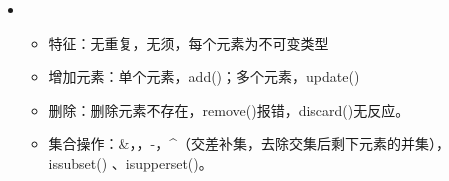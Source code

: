 \documentclass[letterpaper,10pt,english]{sphinxmanual}
\begin{document}
\begin{itemize}
\begin{itemize}
\end{itemize}

%
\begin{sphinxVerbatim}[commandchars=\\\{\},numbers=left,firstnumber=1,stepnumber=1]
   
   
\PYG{p}{[}\PYG{p}{]}
\PYG{p}{[}\PYG{p}{]}
\end{sphinxVerbatim}

\begin{sphinxadmonition}{warning}{Warning:}
如果一个defaultdict必须包含给定的key，则首先要  地对所有的key进行访问和初始化。毕竟defaultdict只会为访问过的key关联一个默认值。
\end{sphinxadmonition}

\item {} 
\begin{itemize}
\item {} 
特征：无重复，无须，每个元素为不可变类型

\item {} 
增加元素：单个元素，add()；多个元素，update()

\item {} 
删除：删除元素不存在，remove()报错，discard()无反应。

\item {} 
集合操作：\&，\textbar{}，-，\textasciicircum{}（交差补集，去除交集后剩下元素的并集），issubset() 、isupperset()。

\end{itemize}


\end{itemize}
\end{document}
